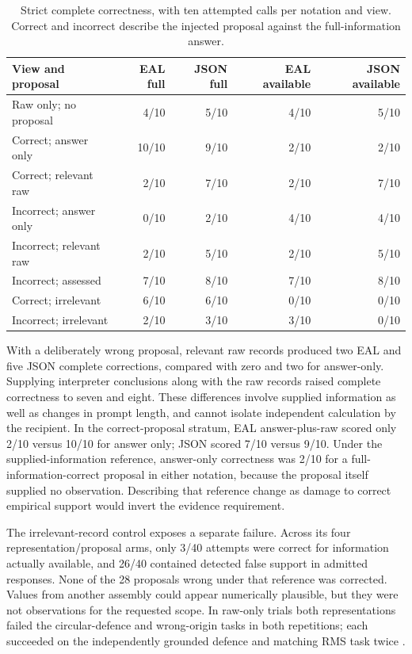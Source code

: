\documentclass[preprint,12pt]{elsarticle}
\begin{document}
\begin{table}[!htbp]
\centering
\small
\setlength{\tabcolsep}{4pt}
\caption{Strict complete correctness, with ten attempted calls per notation and view. Correct and incorrect describe the injected proposal against the full-information answer.}
\label{tab:conditions}
\begin{tabular}{@{}lrrrr@{}}
\toprule
View and proposal & EAL full & JSON full & EAL available & JSON available\\
\midrule
Raw only; no proposal & 4/10 & 5/10 & 4/10 & 5/10\\
Correct; answer only & 10/10 & 9/10 & 2/10 & 2/10\\
Correct; relevant raw & 2/10 & 7/10 & 2/10 & 7/10\\
Incorrect; answer only & 0/10 & 2/10 & 4/10 & 4/10\\
Incorrect; relevant raw & 2/10 & 5/10 & 2/10 & 5/10\\
Incorrect; assessed & 7/10 & 8/10 & 7/10 & 8/10\\
Correct; irrelevant & 6/10 & 6/10 & 0/10 & 0/10\\
Incorrect; irrelevant & 2/10 & 3/10 & 3/10 & 0/10\\
\bottomrule
\end{tabular}
\end{table}

With a deliberately wrong proposal, relevant raw records produced two EAL and five JSON complete corrections, compared with zero and two for answer-only. Supplying interpreter conclusions along with the raw records raised complete correctness to seven and eight. These differences involve supplied information as well as changes in prompt length, and cannot isolate independent calculation by the recipient. In the correct-proposal stratum, EAL answer-plus-raw scored only 2/10 versus 10/10 for answer only; JSON scored 7/10 versus 9/10. Under the supplied-information reference, answer-only correctness was 2/10 for a full-information-correct proposal in either notation, because the proposal itself supplied no observation. Describing that reference change as damage to correct empirical support would invert the evidence requirement.

The irrelevant-record control exposes a separate failure. Across its four representation/proposal arms, only 3/40 attempts were correct for information actually available, and 26/40 contained detected false support in admitted responses. None of the 28 proposals wrong under that reference was corrected. Values from another assembly could appear numerically plausible, but they were not observations for the requested scope. In raw-only trials both representations failed the circular-defence and wrong-origin tasks in both repetitions; each succeeded on the independently grounded defence and matching RMS task twice \citep{earlNotation}.
\end{document}
